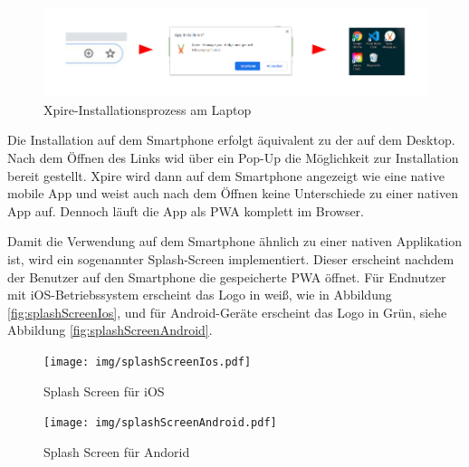 \begin{figure}[h!]
	\centering
	\includegraphics[width=1.1\textwidth]{img/install.pdf}
	\caption{Xpire-Installationsprozess am Laptop}
	\label{fig:install}
\end{figure}

Die Installation auf dem Smartphone erfolgt äquivalent zu der auf dem Desktop. Nach dem Öffnen des Links wid über ein Pop-Up die Möglichkeit zur Installation bereit gestellt. Xpire wird dann auf dem Smartphone angezeigt wie eine native mobile App und weist auch nach dem Öffnen keine Unterschiede zu einer nativen App auf. Dennoch läuft die App als PWA komplett im Browser. 

Damit die Verwendung auf dem Smartphone ähnlich zu einer nativen Applikation ist, wird ein sogenannter Splash-Screen implementiert. Dieser erscheint nachdem der Benutzer auf den Smartphone die gespeicherte PWA öffnet. Für Endnutzer mit iOS-Betriebssystem erscheint das Logo in weiß, wie in Abbildung \vref{fig:splashScreenIos}, und für Android-Geräte erscheint das Logo in Grün, siehe Abbildung \vref{fig:splashScreenAndroid}. 
\begin{figure}[h!]
	\centering
	\texttt{[image: img/splashScreenIos.pdf]}
	\caption{Splash Screen für iOS}
	\label{fig:splashScreenIos}
\end{figure}
\begin{figure}[h!]
	\centering
	\texttt{[image: img/splashScreenAndroid.pdf]}
	\caption{Splash Screen für Andorid}
	\label{fig:splashScreenAndroid}
\end{figure}


